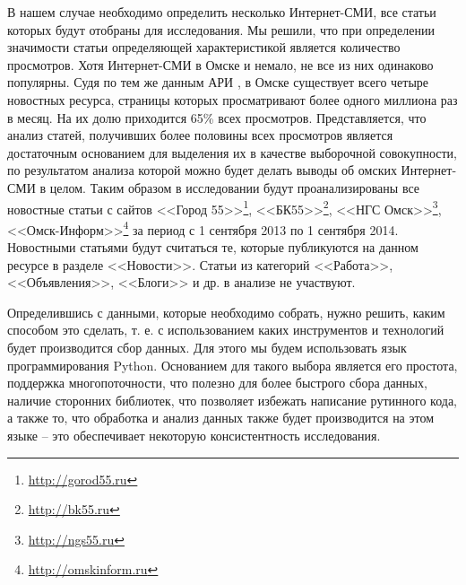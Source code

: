 В нашем случае необходимо определить несколько Интернет-СМИ, все статьи которых будут отобраны для исследования. Мы решили, что при определении значимости статьи определяющей характеристикой является количество просмотров. Хотя Интернет-СМИ в Омске и немало, не все из них одинаково популярны. Судя по тем же данным АРИ \cite{ari_rating}, в Омске существует всего четыре новостных ресурса, страницы которых просматривают более одного миллиона раз в месяц. На их долю приходится 65\% всех просмотров. Представляется, что анализ статей, получивших более половины всех просмотров является достаточным основанием для выделения их в качестве выборочной совокупности, по результатом анализа которой можно будет делать выводы об омских Интернет-СМИ в целом. Таким образом в исследовании будут проанализированы все новостные статьи с сайтов <<Город 55>>\footnote{\href{http://gorod55.ru}{http://gorod55.ru}}, <<БК55>>\footnote{\href{http://bk55.ru}{http://bk55.ru}}, <<НГС Омск>>\footnote{\href{http://ngs55.ru}{http://ngs55.ru}}, <<Омск-Информ>>\footnote{\href{http://omskinform.ru}{http://omskinform.ru}} за период с 1 сентября 2013 по 1 сентября 2014. Новостными статьями будут считаться те, которые публикуются на данном ресурсе в разделе <<Новости>>. Статьи из категорий <<Работа>>, <<Объявления>>, <<Блоги>> и др. в анализе не участвуют.

Определившись с данными, которые необходимо собрать, нужно решить, каким способом это сделать, т. е. с использованием каких инструментов и технологий будет производится сбор данных. Для этого мы будем использовать язык программирования Python. Основанием для такого выбора является его простота, поддержка многопоточности, что полезно для более быстрого сбора данных, наличие сторонних библиотек, что позволяет избежать написание рутинного кода, а также то, что обработка и анализ данных также будет производится на этом языке -- это обеспечивает некоторую консистентность исследования. %


